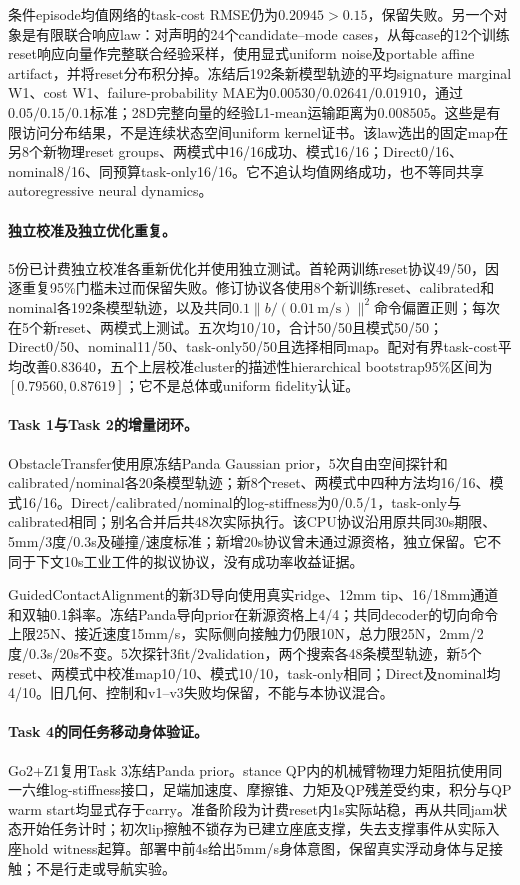 条件episode均值网络的task-cost RMSE仍为$0.20945>0.15$，保留失败。另一个对象是有限联合响应law：对声明的24个candidate--mode cases，从每case的12个训练reset响应向量作完整联合经验采样，使用显式uniform noise及portable affine artifact，并将reset分布积分掉。冻结后192条新模型轨迹的平均signature marginal W1、cost W1、failure-probability MAE为$0.00530/0.02641/0.01910$，通过$0.05/0.15/0.1$标准；28D完整向量的经验L1-mean运输距离为$0.008505$。这些是有限访问分布结果，不是连续状态空间uniform kernel证书。该law选出的固定map在另8个新物理reset groups、两模式中16/16成功、模式16/16；Direct0/16、nominal8/16、同预算task-only16/16。它不追认均值网络成功，也不等同共享autoregressive neural dynamics。

\paragraph{独立校准及独立优化重复。}
5份已计费独立校准各重新优化并使用独立测试。首轮两训练reset协议49/50，因逐重复95\%门槛未过而保留失败。修订协议各使用8个新训练reset、calibrated和nominal各192条模型轨迹，以及共同$0.1\|b/(0.01\,\mathrm{m/s})\|^2$命令偏置正则；每次在5个新reset、两模式上测试。五次均10/10，合计50/50且模式50/50；Direct0/50、nominal11/50、task-only50/50且选择相同map。配对有界task-cost平均改善$0.83640$，五个上层校准cluster的描述性hierarchical bootstrap95\%区间为$[0.79560,0.87619]$；它不是总体或uniform fidelity认证。

\paragraph{Task 1与Task 2的增量闭环。}
ObstacleTransfer使用原冻结Panda Gaussian prior，5次自由空间探针和calibrated/nominal各20条模型轨迹；新8个reset、两模式中四种方法均16/16、模式16/16。Direct/calibrated/nominal的log-stiffness为0/0.5/1，task-only与calibrated相同；别名合并后共48次实际执行。该CPU协议沿用原共同30s期限、5mm/3度/0.3s及碰撞/速度标准；新增20s协议曾未通过源资格，独立保留。它不同于下文10s工业工件的拟议协议，没有成功率收益证据。

GuidedContactAlignment的新3D导向使用真实ridge、12mm tip、16/18mm通道和双轴0.1斜率。冻结Panda导向prior在新源资格上4/4；共同decoder的切向命令上限25N、接近速度15mm/s，实际侧向接触力仍限10N，总力限25N，2mm/2度/0.3s/20s不变。5次探针3fit/2validation，两个搜索各48条模型轨迹，新5个reset、两模式中校准map10/10、模式10/10，task-only相同；Direct及nominal均4/10。旧几何、控制和v1--v3失败均保留，不能与本协议混合。

\paragraph{Task 4的同任务移动身体验证。}
Go2+Z1复用Task 3冻结Panda prior。stance QP内的机械臂物理力矩阻抗使用同一六维log-stiffness接口，足端加速度、摩擦锥、力矩及QP残差受约束，积分与QP warm start均显式存于carry。准备阶段为计费reset内1s实际站稳，再从共同jam状态开始任务计时；初次lip擦触不锁存为已建立座底支撑，失去支撑事件从实际入座hold witness起算。部署中前4s给出5mm/s身体意图，保留真实浮动身体与足接触；不是行走或导航实验。

